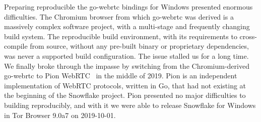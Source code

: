 \documentclass[letterpaper,twocolumn]{article}
\begin{document}
Preparing reproducible the go-webrtc bindings for Windows
presented enormous difficulties.
The Chromium browser
from which go-webrtc was derived
is a massively complex software project,
with a multi-stage and frequently changing build system.
The reproducible build environment,
with its requirements to
cross-compile from source,
without any pre-built binary or proprietary dependencies,
was never a supported build configuration.
The issue stalled us for a long time.
We finally broke through the impasse
by switching from the Chromium-derived go-webrtc
to Pion WebRTC~\cite{pion-webrtc} in the middle of 2019.
Pion is an independent implementation of WebRTC protocols, written in Go,
that had not existing at the beginning of the Snowflake project.
Pion presented no major difficulties to building reproducibly,
and with it we were able to release Snowflake for Windows
in Tor Browser 9.0a7 on \mbox{2019-10-01}.
\end{document}
